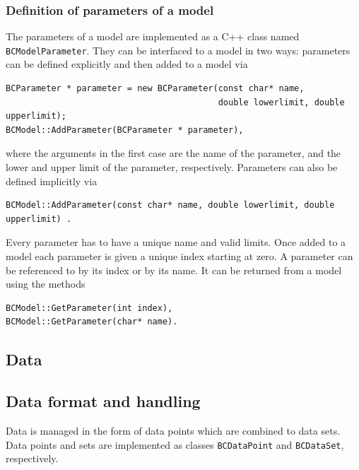 \documentclass[11pt, a4paper]{article}
\begin{document}
\subsubsection{Definition of parameters of a model} 
\label{subsubsection:parameters}

The parameters of a model are implemented as a C++ class named
\verb|BCModelParameter|. They can be interfaced to a model in two
ways: parameters can be defined explicitly and then added to a model
via
%
\begin{verbatim}
BCParameter * parameter = new BCParameter(const char* name, 
                                          double lowerlimit, double upperlimit); 
BCModel::AddParameter(BCParameter * parameter),
\end{verbatim}

\noindent 
where the arguments in the first case are the name of the parameter,
and the lower and upper limit of the parameter,
respectively. Parameters can also be defined implicitly via
%
\begin{verbatim}
BCModel::AddParameter(const char* name, double lowerlimit, double upperlimit) . 
\end{verbatim}

\noindent 
Every parameter has to have a unique name and valid limits. Once added
to a model each parameter is given a unique index starting at zero. A
parameter can be referenced to by its index or by its name. It can be
returned from a model using the methods
% 
\begin{verbatim} 
BCModel::GetParameter(int index), 
BCModel::GetParameter(char* name). 
\end{verbatim}  


\subsection{Data} 
\label{subsection:data} 

\subsection{Data format and handling} 
\label{subsection:dataformat} 

Data is managed in the form of data points which are combined to data
sets. Data points and sets are implemented as classes
\verb|BCDataPoint| and \verb|BCDataSet|, respectively. \\ 
\end{document}
